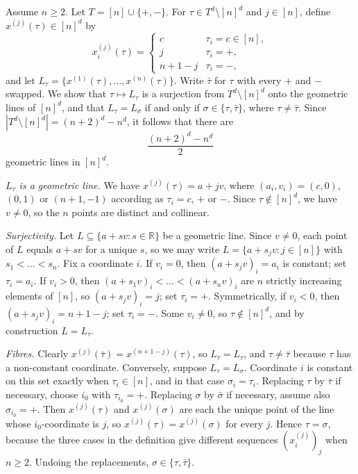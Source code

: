 \documentclass[11pt,letterpaper]{article}
\theoremstyle{definition}
\newcommand{\reals}{\mathbb{R}}
\begin{document}
Assume $n\geq 2$. Let $T = [n]\cup\{+,-\}$. For $\tau\in T^d\setminus[n]^d$ and $j\in[n]$, define $x^{(j)}(\tau)\in[n]^d$ by
\[
x^{(j)}_i(\tau) = \begin{cases} c & \tau_i = c\in[n],\\ j & \tau_i = +,\\ n+1-j & \tau_i = -,\end{cases}
\]
and let $L_\tau = \{x^{(1)}(\tau),\dots,x^{(n)}(\tau)\}$. Write $\bar\tau$ for $\tau$ with every $+$ and $-$ swapped.
We show that $\tau\mapsto L_\tau$ is a surjection from $T^d\setminus[n]^d$ onto the geometric lines of $[n]^d$, and that $L_\tau = L_\sigma$ if and only if $\sigma\in\{\tau,\bar\tau\}$, where $\tau\neq\bar\tau$.
Since $|T^d\setminus[n]^d| = (n+2)^d-n^d$, it follows that there are
\[
\frac{(n+2)^d - n^d}{2}
\]
geometric lines in $[n]^d$.

\emph{$L_\tau$ is a geometric line.} We have $x^{(j)}(\tau) = a + jv$, where $(a_i,v_i) = (c,0)$, $(0,1)$ or $(n+1,-1)$ according as $\tau_i = c$, $+$ or $-$.
Since $\tau\notin[n]^d$, we have $v\neq 0$, so the $n$ points are distinct and collinear.

\emph{Surjectivity.} Let $L\subseteq\{a+sv : s\in\reals\}$ be a geometric line.
Since $v\neq 0$, each point of $L$ equals $a+sv$ for a unique $s$, so we may write $L = \{a+s_jv : j\in[n]\}$ with $s_1<\dots<s_n$.
Fix a coordinate $i$.
If $v_i=0$, then $(a+s_jv)_i = a_i$ is constant; set $\tau_i = a_i$.
If $v_i>0$, then $(a+s_1v)_i<\dots<(a+s_nv)_i$ are $n$ strictly increasing elements of $[n]$, so $(a+s_jv)_i = j$; set $\tau_i = +$.
Symmetrically, if $v_i<0$, then $(a+s_jv)_i = n+1-j$; set $\tau_i = -$.
Some $v_i\neq 0$, so $\tau\notin[n]^d$, and by construction $L = L_\tau$.

\emph{Fibres.} Clearly $x^{(j)}(\bar\tau) = x^{(n+1-j)}(\tau)$, so $L_{\bar\tau} = L_\tau$, and $\tau\neq\bar\tau$ because $\tau$ has a non-constant coordinate.
Conversely, suppose $L_\tau = L_\sigma$.
Coordinate $i$ is constant on this set exactly when $\tau_i\in[n]$, and in that case $\sigma_i = \tau_i$.
Replacing $\tau$ by $\bar\tau$ if necessary, choose $i_0$ with $\tau_{i_0} = +$.
Replacing $\sigma$ by $\bar\sigma$ if necessary, assume also $\sigma_{i_0} = +$.
Then $x^{(j)}(\tau)$ and $x^{(j)}(\sigma)$ are each the unique point of the line whose $i_0$-coordinate is $j$, so $x^{(j)}(\tau) = x^{(j)}(\sigma)$ for every $j$.
Hence $\tau = \sigma$, because the three cases in the definition give different sequences $(x^{(j)}_i)_j$ when $n\geq 2$.
Undoing the replacements, $\sigma\in\{\tau,\bar\tau\}$.
\end{document}
